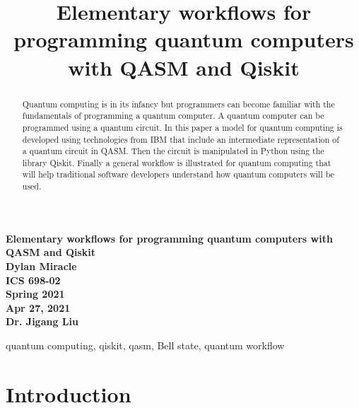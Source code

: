 \documentclass[conference]{IEEEtran}
\begin{document}
\begin{titlepage}
    \begin{center}
        \vspace{4cm}
        \large
        \textbf{
            Elementary workflows for programming quantum computers with QASM and Qiskit \\
            Dylan Miracle \\
            ICS 698-02 \\
            Spring 2021 \\
            Apr 27, 2021 \\
            Dr. Jigang Liu
        }
    \end{center}
\end{titlepage}
\title{Elementary workflows for programming quantum computers with QASM and Qiskit}

\author{
}

\maketitle

\begin{abstract}
Quantum computing is in its infancy but programmers can become familiar with the fundamentals of programming a quantum computer. A quantum computer can be programmed using a quantum circuit. In this paper a model for quantum computing is developed using technologies from IBM that include an intermediate representation of a quantum circuit in QASM. Then the circuit is manipulated in Python using the library Qiskit. Finally a general workflow is illustrated for quantum computing that will help traditional software developers understand how quantum computers will be used. 
\end{abstract}

\begin{IEEEkeywords}
quantum computing, qiskit, qasm, Bell state, quantum workflow
\end{IEEEkeywords}

\section{Introduction}
\end{document}
